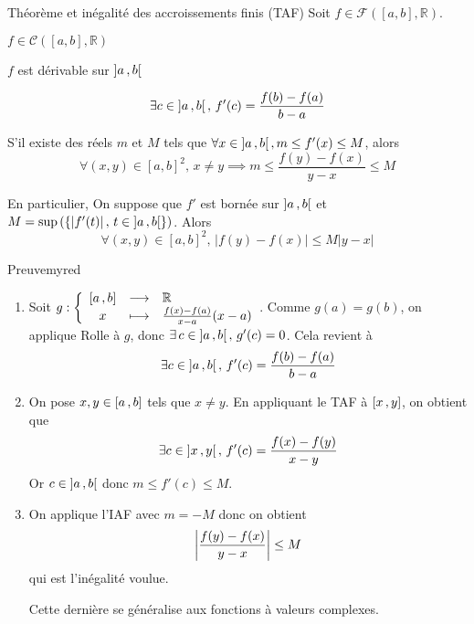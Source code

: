     \begin{theo}{Théorème et inégalité des accroissements finis (TAF)}{}
        Soit $f \in \mathcal{F}([a,b],\mathbb{R})$. 

        \begin{suppose}
            \item $f \in \mathcal{C}([a,b],\mathbb{R})$
            \item $f$ est dérivable sur $\left] a \, , b \right[$
        \end{suppose}
        \begin{alors}
            \item  
            \[\exists  c \in \left] a \, , b \right[, \, f'(c) = \frac{f(b)-f(a)}{b-a} \]
            \item S’il existe des réels $m$ et $M$ tels que $\forall x \in \left] a \, , b \right[ , m \leq f'(x) \leq M$, alors 
            \[ \forall (x,y) \in [a,b]^2, \, x \neq y \implies m \leq \frac{f(y)-f(x)}{y-x} \leq M \]
            \item En particulier, On suppose que $f'$ est bornée sur $\left] a \, , b \right[$ et $M = \sup \left( \left\{ \left| f'(t)\right|  , \, t \in \left] a \, , b \right[ \right\} \right)$. Alors 
            \[ \forall (x,y) \in [a,b]^2, \, \left| f(y) - f(x) \right| \leq M \left| y-x \right| \]
        \end{alors}
    \end{theo}

    \begin{demo}{Preuve}{myred}
        \begin{enumerate}
            \item Soit $\fonction{g}{\intervalleFF{a}{b}}{\mathbb{R}}{x}{\frac{f(x)-f(a)}{x-a}(x-a)}$. Comme $g(a) = g(b)$, on applique Rolle à $g$, donc $\exists \, c \in \left] a \, , b \right[, \, g'(c) = 0$. Cela revient à 
            \[ \exists c \in \left] a \, , b \right[, \, f'(c) = \frac{f(b)-f(a)}{b-a}\]
            \item On pose $x,y \in \left[ a \, , b \right]$ tels que $x \neq y$. En appliquant le TAF à $\left[ x \, , y \right]$, on obtient que \[ \exists c \in \left] x \, , y \right[, \, f'(c) = \frac{f(x)-f(y)}{x-y}\]
            Or $c \in \left] a \, , b \right[$ donc $ m \leq f'(c) \leq M$.
            \item On applique l’IAF avec $m = -M$ donc on obtient 
            \[ \left\lvert \frac{f(y)-f(x)}{y-x}\right\rvert \leq M \] qui est l’inégalité voulue.

            Cette dernière se généralise aux fonctions à valeurs complexes.
        \end{enumerate}  
    \end{demo}

